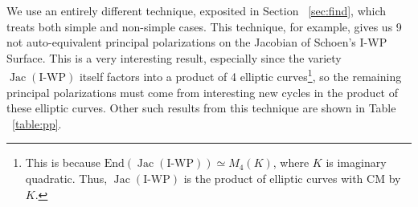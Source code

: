 \documentclass[12pt,reqno]{amsart}
\DeclareMathOperator{\Jac}{Jac}
\newtheorem*{thm*}{Theorem}
\theoremstyle{definition}
\theoremstyle{remark}
\newcommand{\ti}{\todo[inline]}
\begin{document}


We use an entirely different technique, exposited in Section ~\ref{sec:find}, which treats both simple and non-simple cases. This technique, for example, gives us 9 not auto-equivalent principal polarizations on the Jacobian of Schoen's I-WP Surface. This is a very interesting result, especially since the variety $\Jac(\text{I-WP})$ itself factors into a product of 4 elliptic curves\footnote{This is because $\text{End}(\Jac(\text{I-WP})) \simeq M_4(K)$, where $K$ is imaginary quadratic. Thus, $\Jac(\text{I-WP})$ is the product of elliptic curves with CM by $K$.}, so the remaining principal polarizations must come from interesting new cycles in the product of these elliptic curves. Other such results from this technique are shown in Table ~\ref{table:pp}.
\end{document}
